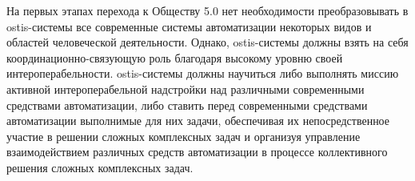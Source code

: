 На первых этапах перехода к Обществу 5.0 нет необходимости преобразовывать в ostis-системы все современные системы автоматизации некоторых видов и областей человеческой деятельности. 
Однако, ostis-системы должны взять на себя координационно-связующую роль благодаря высокому уровню своей интероперабельности. 
ostis-системы должны научиться либо выполнять миссию активной интероперабельной надстройки над различными современными средствами автоматизации, либо ставить перед современными средствами автоматизации выполнимые для них задачи, обеспечивая их непосредственное участие в решении сложных комплексных задач и организуя управление взаимодействием различных средств автоматизации в процессе коллективного решения сложных комплексных задач.







%